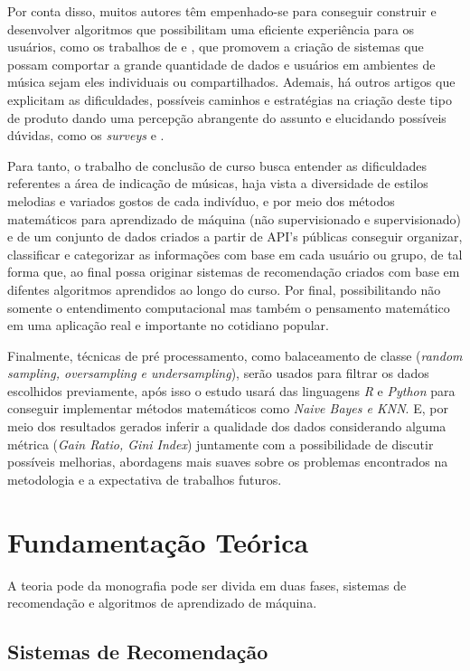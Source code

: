 \documentclass[12pt, %
openright, 
oneside, %
a4paper,    %
brazil]{facom-ufu-abntex2}
\begin{document}
Por conta disso, muitos autores têm empenhado-se para conseguir construir e desenvolver algoritmos que possibilitam uma eficiente experiência para os usuários, como os trabalhos de \cite{de2009se} e \cite{monteirosistema}, \cite{aliaga2019desenvolvimento}
que promovem a criação de sistemas que possam comportar a grande quantidade de dados e usuários em ambientes de música sejam eles individuais ou compartilhados. Ademais, há outros artigos que explicitam as dificuldades, possíveis caminhos e estratégias na criação deste tipo de produto dando uma percepção abrangente do assunto e elucidando possíveis dúvidas, como os \textit{surveys} \cite{de2009se} e \cite{ko2022survey}.


Para tanto, o trabalho de conclusão de curso busca entender as dificuldades referentes a área de indicação de músicas, haja vista a diversidade de estilos melodias e variados gostos de cada indivíduo, e por meio dos métodos matemáticos para aprendizado de máquina (não supervisionado e supervisionado) e de um conjunto de dados criados a partir de API's públicas conseguir organizar, classificar e categorizar as informações com base em cada usuário ou grupo, de tal forma que, ao final possa originar sistemas de recomendação criados com base em difentes algoritmos aprendidos ao longo do curso. Por final, possibilitando não somente o entendimento computacional mas também o pensamento matemático em uma aplicação real e importante no cotidiano popular.


Finalmente, técnicas de pré processamento, como balaceamento de classe (\textit{random sampling, oversampling e undersampling}), serão usados para filtrar os dados escolhidos previamente, após isso o estudo usará das linguagens \textit{R} e \textit{Python} para conseguir implementar métodos matemáticos como \textit{Naive Bayes e KNN}. E, por meio dos resultados gerados inferir a qualidade dos dados considerando alguma métrica (\textit{Gain Ratio, Gini Index}) juntamente com a possibilidade de discutir possíveis melhorias, abordagens mais suaves sobre os problemas encontrados na metodologia e a expectativa de trabalhos futuros.


\chapter{Fundamentação Teórica}
A teoria pode da monografia pode ser divida em duas fases, sistemas de recomendação e algoritmos de aprendizado de máquina.

\section{Sistemas de Recomendação}
\end{document}
